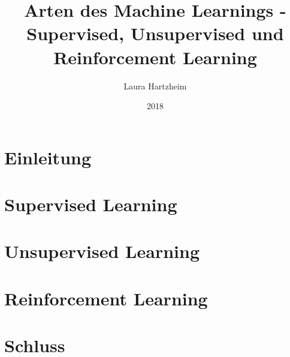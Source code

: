 \documentclass[12pt,titlepage]{article}
\begin{document}
	
	\begin{titlepage}
		\title{Arten des Machine Learnings - Supervised, Unsupervised und Reinforcement Learning}
		\date{2018}
		\author{Laura Hartzheim}
		\maketitle
	\end{titlepage}
	
	\tableofcontents
	\newpage
	\setcounter{page}{1}
	
	\section{Einleitung}
	
	\section{Supervised Learning}
	
	
	\section{Unsupervised Learning}
	
	\section{Reinforcement Learning}
	
	\section{Schluss}
	
\end{document}
